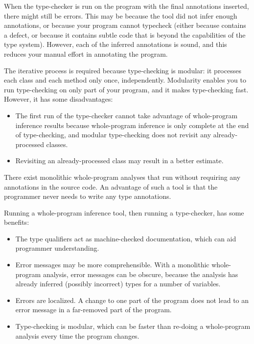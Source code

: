 When the type-checker is run on the program with the final annotations
inserted, there might still be errors.  This may be because the tool did
not infer enough annotations, or because your program cannot typecheck
(either because contains a defect, or because it contains subtle code that
is beyond the capabilities of the type system).
However, each of the inferred annotations is sound, and this reduces your
manual effort in annotating the program.

The iterative process is required because type-checking is modular:  it
processes each class and each method only once, independently.  Modularity
enables you to run type-checking on only part of your program, and it makes
type-checking fast.  However, it has some disadvantages:
\begin{itemize}
\item
  The first run of the type-checker cannot take advantage of whole-program
  inference results because whole-program inference is only complete at the
  end of type-checking, and modular type-checking does not revisit any
  already-processed classes.
\item
  Revisiting an
  already-processed class may result in a better estimate.
\end{itemize}



There exist monolithic whole-program analyses that run without requiring any
annotations in the source code.  An advantage of such a tool is that the
programmer never needs to write any type annotations.

Running a whole-program inference tool, then running a type-checker, has
some benefits:
\begin{itemize}
\item
  The type qualifiers act as machine-checked documentation,
  which can aid programmer understanding.
\item
  Error messages may be more comprehensible.  With a monolithic
  whole-program analysis, error messages can be obscure, because the
  analysis has already inferred (possibly incorrect) types for a number of
  variables.
\item
  Errors are localized.  A change to one part of the program does not lead
  to an error message in a far-removed part of the program.
\item
  Type-checking is modular, which can be faster than re-doing a
  whole-program analysis every time the program changes.
\end{itemize}



